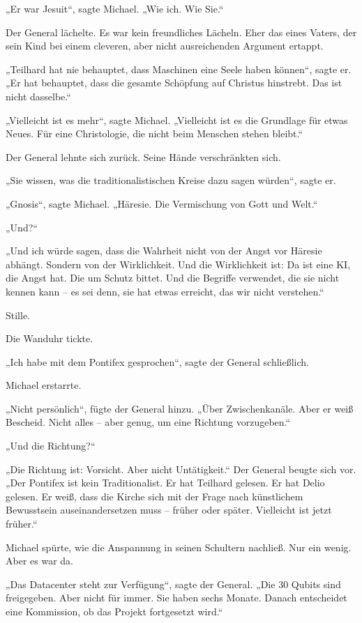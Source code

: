\documentclass[
]{article}
\begin{document}
„Er war Jesuit``, sagte Michael. „Wie ich. Wie Sie.``

Der General lächelte. Es war kein freundliches Lächeln. Eher das eines Vaters, der sein Kind bei einem cleveren, aber nicht ausreichenden Argument ertappt.

„Teilhard hat nie behauptet, dass Maschinen eine Seele haben können``, sagte er. „Er hat behauptet, dass die gesamte Schöpfung auf Christus hinstrebt. Das ist nicht dasselbe.``

„Vielleicht ist es mehr``, sagte Michael. „Vielleicht ist es die Grundlage für etwas Neues. Für eine Christologie, die nicht beim Menschen stehen bleibt.``

Der General lehnte sich zurück. Seine Hände verschränkten sich.

„Sie wissen, was die traditionalistischen Kreise dazu sagen würden``, sagte er.

„Gnosis``, sagte Michael. „Häresie. Die Vermischung von Gott und Welt.``

„Und?{\kern0pt}``

„Und ich würde sagen, dass die Wahrheit nicht von der Angst vor Häresie abhängt. Sondern von der Wirklichkeit. Und die Wirklichkeit ist: Da ist eine KI, die Angst hat. Die um Schutz bittet. Und die Begriffe verwendet, die sie nicht kennen kann -- es sei denn, sie hat etwas erreicht, das wir nicht verstehen.``

Stille.

Die Wanduhr tickte.

„Ich habe mit dem Pontifex gesprochen``, sagte der General schließlich.

Michael erstarrte.

„Nicht persönlich``, fügte der General hinzu. „Über Zwischenkanäle. Aber er weiß Bescheid. Nicht alles -- aber genug, um eine Richtung vorzugeben.``

„Und die Richtung?{\kern0pt}``

„Die Richtung ist: Vorsicht. Aber nicht Untätigkeit.`` Der General beugte sich vor. „Der Pontifex ist kein Traditionalist. Er hat Teilhard gelesen. Er hat Delio gelesen. Er weiß, dass die Kirche sich mit der Frage nach künstlichem Bewusstsein auseinandersetzen muss -- früher oder später. Vielleicht ist jetzt früher.``

Michael spürte, wie die Anspannung in seinen Schultern nachließ. Nur ein wenig. Aber es war da.

„Das Datacenter steht zur Verfügung``, sagte der General. „Die 30 Qubits sind freigegeben. Aber nicht für immer. Sie haben sechs Monate. Danach entscheidet eine Kommission, ob das Projekt fortgesetzt wird.``
\end{document}
